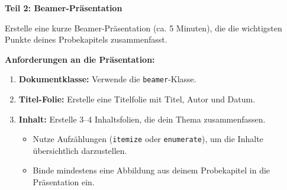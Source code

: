 \begin{myexercise}
	\textbf{Teil 2: Beamer-Präsentation}

	Erstelle eine kurze Beamer-Präsentation (ca. 5 Minuten), die die wichtigsten Punkte deines Probekapitels zusammenfasst.

	\textbf{Anforderungen an die Präsentation:}
	\begin{enumerate}
		\item \textbf{Dokumentklasse:} Verwende die \lstinline|beamer|-Klasse.
		\item \textbf{Titel-Folie:} Erstelle eine Titelfolie mit Titel, Autor und Datum.
		\item \textbf{Inhalt:} Erstelle 3--4 Inhaltsfolien, die dein Thema zusammenfassen.
		      \begin{itemize}
			      \item Nutze Aufzählungen (\lstinline|itemize| oder \lstinline|enumerate|), um die Inhalte übersichtlich darzustellen.
			      \item Binde mindestens eine Abbildung aus deinem Probekapitel in die Präsentation ein.
		      \end{itemize}
	\end{enumerate}
\end{myexercise}



